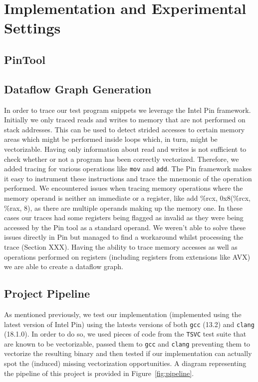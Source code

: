 \documentclass[acmsmall,review, nonacm]{acmart}
\begin{document}
\section{Implementation and Experimental Settings}

\subsection{PinTool}

\subsection{Dataflow Graph Generation}
In order to trace our test program snippets we leverage the Intel Pin framework. Initially we only traced reads 
and writes to memory that are not performed on stack addresses. This can be used to detect strided 
accesses to certain memory areas which might be performed inside loops which, in turn, might be vectorizable.
Having only information about read and writes is not sufficient to check whether or not a program 
has been correctly vectorized. Therefore, we added tracing for various operations like \texttt{mov} and \texttt{add}. 
The Pin framework makes it easy to instrument these instructions and trace the mnemonic of the 
operation performed. We encountered issues when tracing memory operations where the memory operand 
is neither an immediate or a register, like add \%rcx, 0x8(\%rcx, \%rax, 8), as there are multiple 
operands making up the memory one. In these cases our traces had some registers being flagged as 
invalid as they were being accessed by the Pin tool as a standard operand. We weren't able to solve 
these issues directly in Pin but managed to find a workaround whilst processing the trace (Section XXX).
Having the ability to trace memory accesses as well as operations performed on registers 
(including registers from extensions like AVX) we are able to create a dataflow graph.


\subsection{Project Pipeline}
As mentioned previously, we test our implementation (implemented using the latest version of Intel Pin) using the latests versions of 
both \texttt{gcc} (13.2) and \texttt{clang} (18.1.0). In order to do so, we used pieces of code from the \texttt{TSVC} test suite
that are known to be vectorizable, passed them to \texttt{gcc} and \texttt{clang} preventing them to vectorize the resulting binary and then tested 
if our implementation can actually spot the (induced) missing vectorization opportunities. 
A diagram representing the pipeline of this project is provided in Figure~\ref{fig:pipeline}.
\end{document}
